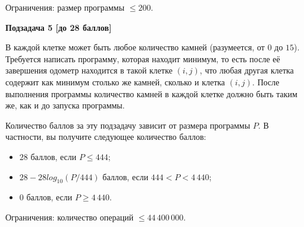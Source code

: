 Ограничения: размер программы $\le 200$.


\textbf{Подзадача 5 [до 28 баллов]}

В каждой клетке может быть любое количество камней (разумеется, от $0$ до $15$). Требуется
написать программу, которая находит минимум, то есть после её завершения одометр
находится в такой клетке $(i, j)$, что любая другая клетка содержит как минимум столько же
камней, сколько и клетка $(i, j)$. После выполнения программы количество камней в
каждой клетке должно быть таким же, как и до запуска программы.

Количество баллов за эту подзадачу зависит от размера программы $P$. В частности, вы
получите следующее количество баллов:
\begin{itemize}
\item $28$ баллов, если $P \le 444$;
\item $28 - 28 log_{10} (P / 444)$ баллов, если $444 < P < 4\,440$;
\item $0$ баллов, если $P \ge 4\,440$.
\end{itemize}

Ограничения: количество операций $\le 44\,400\,000$.